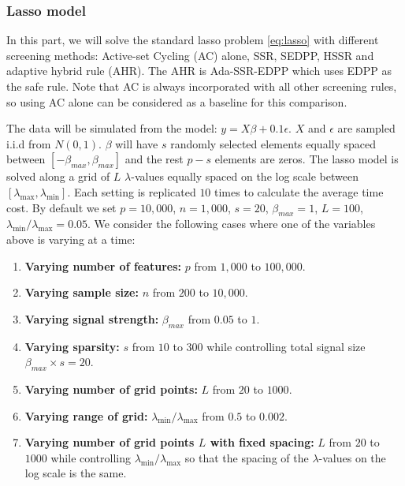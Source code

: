 \subsubsection{Lasso model}

In this part, we will solve the standard lasso problem \eqref{eq:lasso} with different screening methods: Active-set Cycling (AC) alone, SSR, SEDPP, HSSR and adaptive hybrid rule (AHR). The AHR is Ada-SSR-EDPP which uses EDPP as the safe rule. Note that AC is always incorporated with all other screening rules, so using AC alone can be considered as a baseline for this comparison.

The data will be simulated from the model: $y=X\beta+0.1\epsilon$. $X$ and $\epsilon$ are sampled i.i.d from $N(0,1)$. $\beta$ will have $s$ randomly selected elements equally spaced between $[-\beta_{max},\beta_{max}]$ and the rest $p-s$ elements are zeros. The lasso model is solved along a grid of $L$ $\lambda$-values equally spaced on the log scale between $[\lambda_{\max},\lambda_{\min}]$. Each setting is replicated $10$ times to calculate the average time cost. By default we set $p=10,000$, $n=1,000$, $s=20$, $\beta_{max}=1$, $L=100$, $\lambda_{\min}/\lambda_{\max}=0.05$. We consider the following cases where one of the variables above is varying at a time:

\begin{enumerate}
    \item \textbf{Varying number of features:} $p$ from $1,000$ to $100,000$.
    \item \textbf{Varying sample size:} $n$ from $200$ to $10,000$.
    \item \textbf{Varying signal strength:} $\beta_{max}$ from $0.05$ to $1$.
    \item \textbf{Varying sparsity:} $s$ from $10$ to $300$ while controlling total signal size $\beta_{max}\times s=20$.
    \item \textbf{Varying number of grid points:}  $L$ from $20$ to $1000$.
    \item \textbf{Varying range of grid:}  $\lambda_{\min}/\lambda_{\max}$ from $0.5$ to $0.002$.
    \item \textbf{Varying number of grid points $L$ with fixed spacing:} $L$ from $20$ to $1000$ while controlling $\lambda_{\min}/\lambda_{\max}$ so that the spacing of the $\lambda$-values on the log scale is the same.
\end{enumerate}

